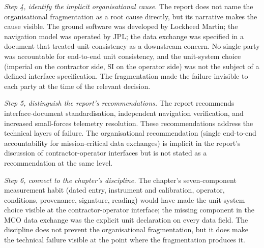 \begin{exercise}
\textit{Step 4, identify the implicit organisational cause.} The
report does not name the organisational fragmentation as a root cause
directly, but its narrative makes the cause visible. The ground
software was developed by Lockheed Martin; the navigation model was
operated by JPL; the data exchange was specified in a document that
treated unit consistency as a downstream concern. No single party was
accountable for end-to-end unit consistency, and the unit-system
choice (imperial on the contractor side, SI on the operator side) was
not the subject of a defined interface specification. The
fragmentation made the failure invisible to each party at the time of
the relevant decision.

\textit{Step 5, distinguish the report's recommendations.} The report
recommends interface-document standardisation, independent navigation
verification, and increased small-forces telemetry resolution. These
recommendations address the technical layers of failure. The
organisational recommendation (single end-to-end accountability for
mission-critical data exchanges) is implicit in the report's
discussion of contractor-operator interfaces but is not stated as a
recommendation at the same level.

\textit{Step 6, connect to the chapter's discipline.} The
chapter's seven-component measurement habit (dated entry, instrument
and calibration, operator, conditions, provenance, signature, reading)
would have made the unit-system choice visible at the
contractor-operator interface; the missing component in the MCO data
exchange was the explicit unit declaration on every data field. The
discipline does not prevent the organisational fragmentation, but it
does make the technical failure visible at the point where the
fragmentation produces it.
\end{exercise}


